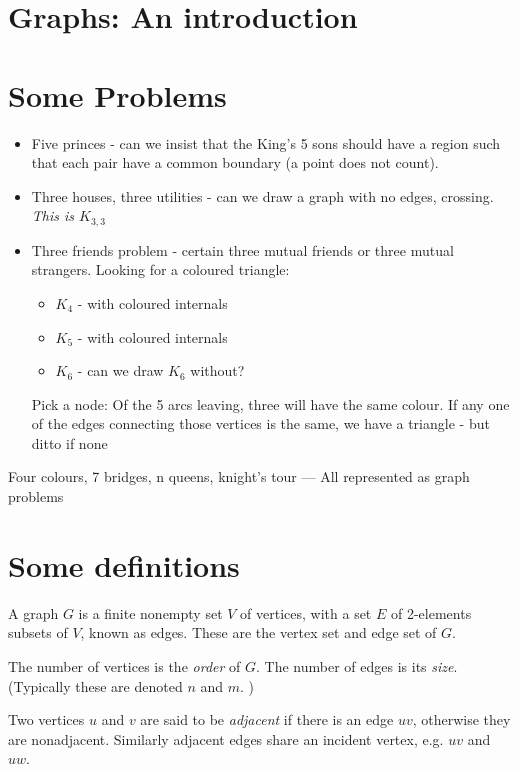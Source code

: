 \section{Graphs: An introduction}
\label{title}

\section{Some Problems}

\begin{itemize}
	\item Five princes - can we insist that the King’s 5 sons should have a region such that each pair have a common boundary (a point does not count). 
	\item Three houses, three utilities - can we draw a graph with no edges, crossing. \textit{This is $K_{3,3}$}
	\item Three friends problem -  certain three mutual friends or three mutual strangers. Looking for a coloured triangle: 
	\begin{itemize}
		\item $K_4$ - with coloured internals 
		\item $K_5$ - with coloured internals 
		\item $K_6$ - can we draw $K_6$ without?
		\end{itemize} 
	Pick a node: Of the 5 arcs leaving, three will have the same colour. 
	If any one of the edges connecting those vertices is the same, we have a triangle - but ditto if none 
	
\end{itemize}

Four colours, 7 bridges, n queens, knight’s tour --- All represented as graph problems 

\section{Some definitions}

A graph $G$ is a finite nonempty set $V$ of vertices, with a set $E$ of 2-elements subsets of $V$, known as edges. These are the vertex set and edge set of $G$. 

The number of vertices is the \textit{order} of $G$. The number of edges is its \textit{size}. (Typically these are denoted $n$ and $m$. )

Two vertices $u$ and $v$ are said to be \textit{adjacent} if there is an edge $uv$, otherwise they are nonadjacent. Similarly adjacent edges share an incident vertex, e.g. $uv$ and $uw$.


